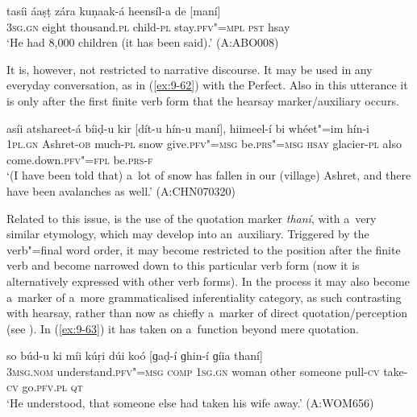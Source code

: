 \begin{exe}
\ex
\label{ex:9-61}
\gll tasíi áaṣṭ zára kuṇaak-á heensíl-a de [maní] \\
3\textsc{sg.gn} eight thousand.\textsc{pl} child-\textsc{pl} stay.\textsc{pfv"=mpl} \textsc{pst} hsay \\
\glt `He had 8,000 children (it has been said).' (A:ABO008)
\end{exe}

It is, however, not restricted to narrative discourse. It may be used in any everyday conversation, as in (\ref{ex:9-62}) with the Perfect. Also in this utterance it is only after the first finite verb form that the hearsay marker/auxiliary occurs.

\begin{exe}
\ex
\label{ex:9-62}
\gll asíi atshareet-á bíiḍ-u kir [dít-u hín-u maní], hiimeel-í bi whéet"=im hín-i \\
\textsc{1pl.gn} Ashret-\textsc{ob} much-\textsc{pl} snow give.\textsc{pfv"=msg} be.\textsc{prs"=msg} \textsc{hsay} glacier-\textsc{pl} also come.down.\textsc{pfv"=fpl} be.\textsc{prs-f} \\
\glt `(I have been told that) a~lot of snow has fallen in our (village) Ashret, and there have been
avalanches as well.' (A:CHN070320)
\end{exe}

Related to this issue, is the use of the quotation marker \textit{thaní}, with a~very similar etymology, which may develop into an~auxiliary. Triggered by the verb"=final word order, it may become restricted to the position after the finite verb and become narrowed down to this particular verb form (now it is alternatively expressed with other verb forms). In the process it may also become a~marker of a~more grammaticalised inferentiality category, as such contrasting with hearsay, rather than now as chiefly a~marker of direct quotation/perception (see ). In (\ref{ex:9-63}) it has taken on a~function beyond mere quotation.

\begin{exe}
\ex
\label{ex:9-63}
\gll so búd-u ki míi kúṛi dúi koó [ɡaḍ-í ɡhin-í ɡíia thaní]  \\
\textsc{3msg.nom} understand.\textsc{pfv"=msg} \textsc{comp} \textsc{1sg.gn} woman  other someone pull-\textsc{cv} take-\textsc{cv} go.\textsc{pfv.pl} \textsc{qt} \\
\glt `He understood, that someone else had taken his wife away.' (A:WOM656)
\end{exe}


